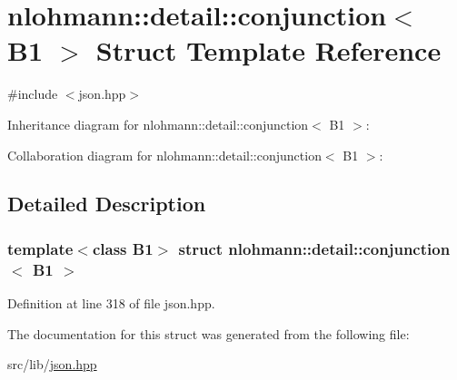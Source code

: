 \hypertarget{structnlohmann_1_1detail_1_1conjunction_3_01_b1_01_4}{}\section{nlohmann\+:\+:detail\+:\+:conjunction$<$ B1 $>$ Struct Template Reference}
\label{structnlohmann_1_1detail_1_1conjunction_3_01_b1_01_4}


{\ttfamily \#include $<$json.\+hpp$>$}



Inheritance diagram for nlohmann\+:\+:detail\+:\+:conjunction$<$ B1 $>$\+:


Collaboration diagram for nlohmann\+:\+:detail\+:\+:conjunction$<$ B1 $>$\+:


\subsection{Detailed Description}
\subsubsection*{template$<$class B1$>$\newline
struct nlohmann\+::detail\+::conjunction$<$ B1 $>$}



Definition at line 318 of file json.\+hpp.



The documentation for this struct was generated from the following file\+:\begin{DoxyCompactItemize}
\item 
src/lib/\hyperlink{json_8hpp}{json.\+hpp}\end{DoxyCompactItemize}
